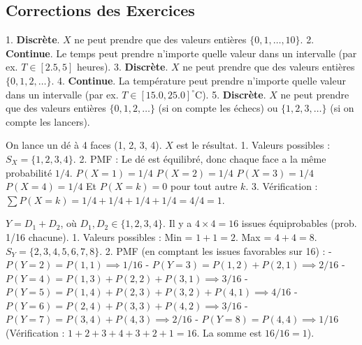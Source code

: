 \subsection{Corrections des Exercices}


\begin{correctionbox}
1.  \textbf{Discrète}. $X$ ne peut prendre que des valeurs entières $\{0, 1, \dots, 10\}$.
2.  \textbf{Continue}. Le temps peut prendre n'importe quelle valeur dans un intervalle (par ex. $T \in [2.5, 5]$ heures).
3.  \textbf{Discrète}. $X$ ne peut prendre que des valeurs entières $\{0, 1, 2, \dots\}$.
4.  \textbf{Continue}. La température peut prendre n'importe quelle valeur dans un intervalle (par ex. $T \in [15.0, 25.0]^\circ\text{C}$).
5.  \textbf{Discrète}. $X$ ne peut prendre que des valeurs entières $\{0, 1, 2, \dots\}$ (si on compte les échecs) ou $\{1, 2, 3, \dots\}$ (si on compte les lancers).
\end{correctionbox}

\begin{correctionbox}
On lance un dé à 4 faces (1, 2, 3, 4). $X$ est le résultat.
1.  Valeurs possibles : $S_X = \{1, 2, 3, 4\}$.
2.  PMF : Le dé est équilibré, donc chaque face a la même probabilité $1/4$.
    $P(X=1) = 1/4$
    $P(X=2) = 1/4$
    $P(X=3) = 1/4$
    $P(X=4) = 1/4$
    Et $P(X=k) = 0$ pour tout autre $k$.
3.  Vérification : $\sum P(X=k) = 1/4 + 1/4 + 1/4 + 1/4 = 4/4 = 1$.
\end{correctionbox}

\begin{correctionbox}
$Y = D_1 + D_2$, où $D_1, D_2 \in \{1, 2, 3, 4\}$. Il y a $4 \times 4 = 16$ issues équiprobables (prob. 1/16 chacune).
1.  Valeurs possibles : Min = $1+1=2$. Max = $4+4=8$. $S_Y = \{2, 3, 4, 5, 6, 7, 8\}$.
2.  PMF (en comptant les issues favorables sur 16) :
    - $P(Y=2) = P(1,1) \implies 1/16$
    - $P(Y=3) = P(1,2) + P(2,1) \implies 2/16$
    - $P(Y=4) = P(1,3) + P(2,2) + P(3,1) \implies 3/16$
    - $P(Y=5) = P(1,4) + P(2,3) + P(3,2) + P(4,1) \implies 4/16$
    - $P(Y=6) = P(2,4) + P(3,3) + P(4,2) \implies 3/16$
    - $P(Y=7) = P(3,4) + P(4,3) \implies 2/16$
    - $P(Y=8) = P(4,4) \implies 1/16$
    (Vérification : $1+2+3+4+3+2+1 = 16$. La somme est $16/16 = 1$).
\end{correctionbox}


